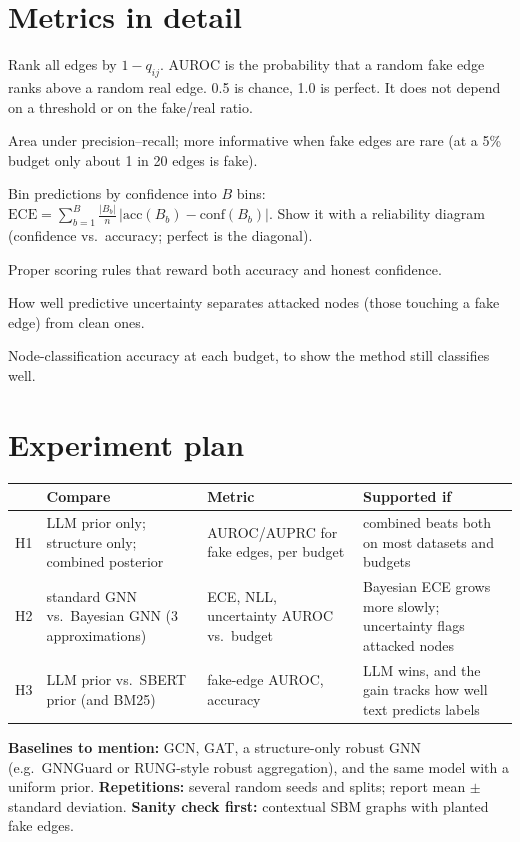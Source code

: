 \documentclass[11pt]{article}
\begin{document}
\section{Metrics in detail}
\begin{description}[style=nextline]
  \item[AUROC (H1, H3)] Rank all edges by $1-q_{ij}$. AUROC is the probability that a random
    fake edge ranks above a random real edge. 0.5 is chance, 1.0 is perfect. It does not
    depend on a threshold or on the fake/real ratio.
  \item[AUPRC] Area under precision--recall; more informative when fake edges are rare (at a
    5\% budget only about 1 in 20 edges is fake).
  \item[Expected calibration error (H2)] Bin predictions by confidence into $B$ bins:
    $\text{ECE} = \sum_{b=1}^{B} \frac{|B_b|}{n}\,\bigl|\text{acc}(B_b) - \text{conf}(B_b)\bigr|$.
    Show it with a reliability diagram (confidence vs.\ accuracy; perfect is the diagonal).
  \item[Negative log-likelihood and Brier score] Proper scoring rules that reward both
    accuracy and honest confidence.
  \item[Uncertainty AUROC (H2)] How well predictive uncertainty separates attacked nodes
    (those touching a fake edge) from clean ones.
  \item[Accuracy under attack] Node-classification accuracy at each budget, to show the
    method still classifies well.
\end{description}

\section{Experiment plan}
\begin{center}
\small
\begin{tabularx}{\linewidth}{>{\raggedright\arraybackslash}p{1.1cm}>{\raggedright\arraybackslash}X>{\raggedright\arraybackslash}X>{\raggedright\arraybackslash}X}
\toprule
& Compare & Metric & Supported if \\
\midrule
H1 & LLM prior only; structure only; combined posterior & AUROC/AUPRC for fake edges, per budget & combined beats both on most datasets and budgets \\
H2 & standard GNN vs.\ Bayesian GNN (3 approximations) & ECE, NLL, uncertainty AUROC vs.\ budget & Bayesian ECE grows more slowly; uncertainty flags attacked nodes \\
H3 & LLM prior vs.\ SBERT prior (and BM25) & fake-edge AUROC, accuracy & LLM wins, and the gain tracks how well text predicts labels \\
\bottomrule
\end{tabularx}
\end{center}
\textbf{Baselines to mention:} GCN, GAT, a structure-only robust GNN (e.g.\ GNNGuard or
RUNG-style robust aggregation), and the same model with a uniform prior.
\textbf{Repetitions:} several random seeds and splits; report mean $\pm$ standard deviation.
\textbf{Sanity check first:} contextual SBM graphs with planted fake edges.
\end{document}
